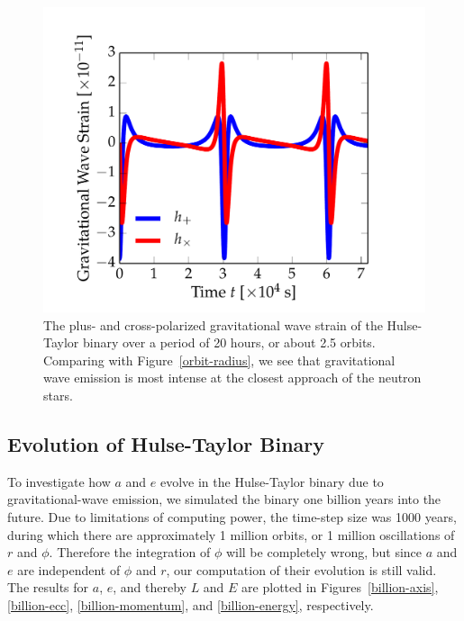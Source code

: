 \documentclass[preprint2]{aastex}
\begin{document}
\begin{figure}[t!]
\centering
\hspace*{-1cm}\includegraphics[width=1.2\textwidth]{orbit_figs/gw-strain.pdf}
\caption{The plus- and cross-polarized gravitational wave strain of the Hulse-Taylor binary over a period of 20 hours, or about 2.5 orbits. Comparing with Figure~\ref{orbit-radius}, we see that gravitational wave emission is most intense at the closest approach of the neutron stars.}
\label{orbit-strain}
\end{figure}

\subsection{Evolution of Hulse-Taylor Binary}

To investigate how \(a\) and \(e\) evolve in the Hulse-Taylor binary due to gravitational-wave emission, we simulated the binary one billion years into the future. Due to limitations of computing power, the time-step size was 1000 years, during which there are approximately 1 million orbits, or 1 million oscillations of \(r\) and \(\phi\). Therefore the integration of \(\phi\) will be completely wrong, but since \(a\) and \(e\) are independent of \(\phi\) and \(r\), our computation of their evolution is still valid. The results for \(a\), \(e\), and thereby \(L\) and \(E\) are plotted in Figures~\ref{billion-axis}, \ref{billion-ecc}, \ref{billion-momentum}, and \ref{billion-energy}, respectively.
\end{document}
